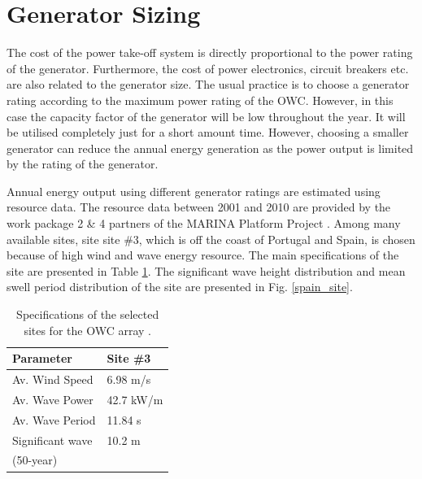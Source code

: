 \documentclass[twocolumn]{article}
\begin{document}
\section{Generator Sizing}

The cost of the power take-off system is directly proportional to the power rating of the generator. Furthermore, the cost of power electronics, circuit breakers etc. are also related to the generator size. The usual practice is to choose a generator rating according to the maximum power rating of the OWC. However, in this case the capacity factor of the generator will be low throughout the year. It will be utilised completely just for a short amount time. However, choosing a smaller generator can reduce the annual energy generation as the power output is limited by the rating of the generator.

Annual energy output using different generator ratings are estimated using resource data. The resource data between 2001 and 2010 are provided by the work package 2 \& 4 partners of the MARINA Platform Project \cite{Gao2012}. Among many available sites, site site \#3, which is off the coast of Portugal and Spain, is chosen because of high wind and wave energy resource. The main specifications of the site are presented in Table \ref{site_spec}. The significant wave height distribution and mean swell period distribution of the site are presented in Fig. \ref{spain_site}.

\begin{table}
  \centering
  \begin{tabular}{ll}
   Parameter & Site \#3 \\
  \hline
Av. Wind Speed & 6.98 m/s \\
Av. Wave Power & 42.7 kW/m \\
Av. Wave Period & 11.84 s \\
Significant wave & 10.2 m  \\
(50-year) \\
\hline
  \end{tabular}
  \caption{Specifications of the selected sites for the OWC array \cite{Gao2012}.}
  \label{site_spec}
\end{table}
\end{document}
